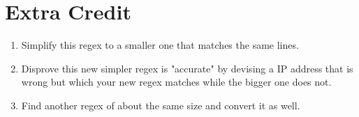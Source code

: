 \section{Extra Credit}

\begin{enumerate}
\item Simplify this regex to a smaller one that matches the same lines.
\item Disprove this new simpler regex is "accurate" by devising a IP address
    that is wrong but which your new regex matches while the bigger one 
    does not.
\item Find another regex of about the same size and convert it as well.
\end{enumerate}


